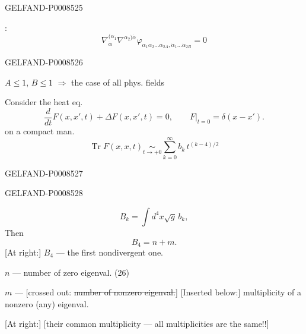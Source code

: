 \begin{GelfandAdjacentEvidence}{GELFAND-P000852}{5}


:
\[
\nabla_{\dot\alpha}^{(\alpha_1}\nabla^{\alpha_2)\dot\alpha}
\varphi_{\alpha_1\alpha_2\ldots\alpha_{2A},\dot\alpha_1\ldots\dot\alpha_{2B}}=0
\tag{27}
\]
\end{GelfandAdjacentEvidence}
\begin{GelfandAdjacentEvidence}{GELFAND-P000852}{6}

\(A\leq1\), \(B\leq1\) \(\Rightarrow\) the case of all phys. fields

Consider the heat eq.
\[
\frac{d}{dt}F(x,x',t)+\Delta F(x,x',t)=0,\qquad
F\big|_{t=0}=\delta(x-x').\tag{28}
\]
on a compact man.
\[
\operatorname{Tr}F(x,x,t)\underset{t\to+0}{\sim}
\sum_{k=0}^{\infty}b_k\,t^{(k-4)/2}\tag{29}
\]
\end{GelfandAdjacentEvidence}
\begin{GelfandAdjacentEvidence}{GELFAND-P000852}{7}

\end{GelfandAdjacentEvidence}
\begin{GelfandAdjacentEvidence}{GELFAND-P000852}{8}

\[
B_k=\int d^4x\sqrt{g}\,b_k,\tag{30}
\]
Then
\[
B_4=n+m.\tag{31}
\]
[At right:] \(B_4\) — the first nondivergent one.

\(n\) — number of zero eigenval. (26)

\(m\) — [crossed out: \sout{number of nonzero eigenval.}]
[Inserted below:] multiplicity of a nonzero (any) eigenval.

[At right:] [their common multiplicity — all multiplicities are the same!!]
\end{GelfandAdjacentEvidence}
